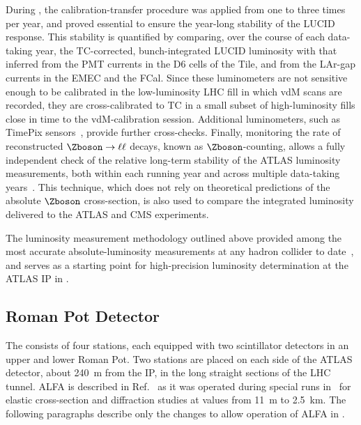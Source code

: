 \documentclass[cernpreprint, atlasdraft=false, UKenglish,british,orcidlogo, texmf, orcidlogo]{atlasdoc}
\begin{document}
During \RunTwo, the calibration-transfer procedure was applied from one to three times per year, and proved essential to ensure the year-long stability of the \gls{LUCID} response. This stability is quantified by comparing, over the course of each data-taking year, the \gls{TC}-corrected, bunch-integrated \gls{LUCID} luminosity with that inferred from the \gls{PMT} currents in the D6 cells of the \gls{Tile}, and from the \gls{LAr}-gap currents in the \gls{EMEC} and the \gls{FCal}. Since these luminometers are not sensitive enough to be calibrated in the low-luminosity \gls{LHC} fill in which \gls{vdM} scans are recorded, they are cross-calibrated to \gls{TC} in a small subset of high-luminosity fills close in time to the \gls{vdM}-calibration session. Additional luminometers, such as TimePix sensors~\cite{TimePix}, provide further cross-checks. Finally, monitoring the rate of reconstructed  $\Zboson \rightarrow \ell\ell$ decays, known as $\Zboson$-counting, allows a fully independent check of the relative long-term stability of the ATLAS luminosity measurements, both within each running year and across multiple data-taking years~\cite{ATL-DAPR-PUB-2021-001}. This technique, which does not rely on theoretical predictions of the absolute $\Zboson$ cross-section, is also used to compare the integrated luminosity delivered to the ATLAS and \acrshort{CMS} experiments.
 
The luminosity measurement methodology outlined above provided among the most accurate absolute-luminosity measurements at any hadron collider to date~\cite{DAPR-2021-01}, and serves as a starting point for high-precision luminosity determination at the ATLAS \gls{IP} in \RunThr.



 
\subsection{ Roman Pot Detector}\label{alfa} 
The  consists of four stations, each equipped with two scintillator detectors in an upper and lower Roman Pot. Two stations are placed on each side of the ATLAS detector, about \SI{240}{\m} from the \gls{IP}, in the long straight sections of the \gls{LHC} tunnel.
\gls{ALFA} is described in Ref.~\cite{ALFA-Detector} as it was operated during special runs  in \RunTwo\ for elastic cross-section and diffraction studies at \betastar values from \SI{11}{\m} to \SI{2.5}{\km}.
The following paragraphs describe only the changes to allow operation of \gls{ALFA} in \RunThr.
 
\end{document}
